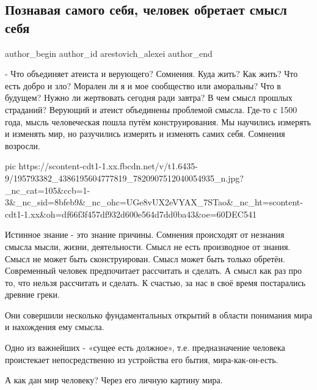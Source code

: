  
 
 
 
 
 
\subsection{Познавая самого себя, человек обретает смысл себя}
\label{sec:03_06_2021.fb.arestovich_alexei.1.smysl_chelovek}
\ifcmt
 author_begin
   author_id arestovich_alexei
 author_end
\fi

- Что объединяет атеиста и верующего?
Сомнения.
Куда жить? Как жить? Что есть добро и зло? Морален ли я и мое сообщество или аморальны?
Что в будущем? Нужно ли жертвовать сегодня ради завтра? В чем смысл прошлых страданий?
Верующий и атеист объединены проблемой смысла.
Где-то с 1500 года, мысль человеческая пошла путём конструирования.
Мы научились измерять и изменять мир, но разучились измерять и изменять самих себя.
Сомнения возросли. 

\ifcmt
  pic https://scontent-cdt1-1.xx.fbcdn.net/v/t1.6435-9/195793382_4386195604777819_7820907512040054935_n.jpg?_nc_cat=105&ccb=1-3&_nc_sid=8bfeb9&_nc_ohc=UGe8vUX2eVYAX_7STao&_nc_ht=scontent-cdt1-1.xx&oh=df66f3f457df932d600e564d7dd0ba43&oe=60DEC541
\fi

Истинное знание - это знание причины.
Сомнения происходят от незнания смысла мысли, жизни, деятельности. 
Смысл не есть производное от знания.
Смысл не может быть сконструирован.
Смысл может быть только обретён.
Современный человек предпочитает рассчитать и сделать.
А смысл как раз про то, что нельзя рассчитать и сделать.
К счастью, за нас в своё время постарались древние греки.

Они совершили несколько фундаментальных открытий в области понимания мира и нахождения ему смысла.

Одно из важнейших - «сущее есть должное», т.е. предназначение человека
проистекает непосредственно из устройства его бытия, мира-как-он-есть.

А как дан мир человеку? Через его личную картину мира. 

